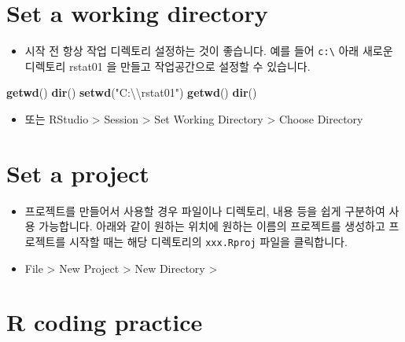 \documentclass[
]{book}
\newenvironment{Shaded}{\begin{snugshade}}{\end{snugshade}}
\newcommand{\CharTok}[1]{\textcolor[rgb]{0.31,0.60,0.02}{#1}}
\newcommand{\KeywordTok}[1]{\textcolor[rgb]{0.13,0.29,0.53}{\textbf{#1}}}
\newcommand{\NormalTok}[1]{#1}
\newcommand{\StringTok}[1]{\textcolor[rgb]{0.31,0.60,0.02}{#1}}
\providecommand{\tightlist}{%
  \setlength{\itemsep}{0pt}\setlength{\parskip}{0pt}}
\begin{document}
\hypertarget{set-a-working-directory}{%
\section{Set a working directory}\label{set-a-working-directory}}

\begin{itemize}
\tightlist
\item
  시작 전 항상 작업 디렉토리 설정하는 것이 좋습니다. 예를 들어 \texttt{c:\textbackslash{}} 아래 새로운 디렉토리 rstat01 을 만들고 작업공간으로 설정할 수 있습니다.
\end{itemize}

\begin{Shaded}
\begin{Highlighting}[]
\KeywordTok{getwd}\NormalTok{()}
\KeywordTok{dir}\NormalTok{()}
\KeywordTok{setwd}\NormalTok{(}\StringTok{"C:}\CharTok{\textbackslash{}\textbackslash{}}\StringTok{rstat01"}\NormalTok{)}
\KeywordTok{getwd}\NormalTok{()}
\KeywordTok{dir}\NormalTok{()}
\end{Highlighting}
\end{Shaded}

\begin{itemize}
\tightlist
\item
  또는 RStudio \textgreater{} Session \textgreater{} Set Working Directory \textgreater{} Choose Directory
\end{itemize}

\hypertarget{set-a-project}{%
\section{Set a project}\label{set-a-project}}

\begin{itemize}
\item
  프로젝트를 만들어서 사용할 경우 파일이나 디렉토리, 내용 등을 쉽게 구분하여 사용 가능합니다. 아래와 같이 원하는 위치에 원하는 이름의 프로젝트를 생성하고 프로젝트를 시작할 때는 해당 디렉토리의 \texttt{xxx.Rproj} 파일을 클릭합니다.
\item
  File \textgreater{} New Project \textgreater{} New Directory \textgreater{}
\end{itemize}

\hypertarget{r-coding-practice}{%
\section{R coding practice}\label{r-coding-practice}}
\end{document}
